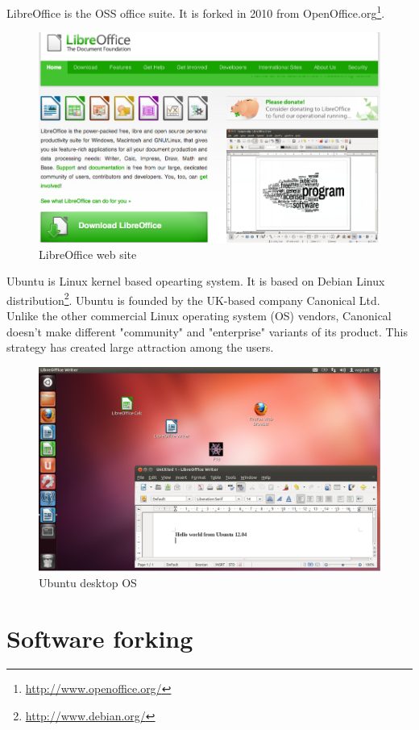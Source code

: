 \documentclass[times, utf8, seminar]{fit}
\begin{document}
LibreOffice is the OSS office suite. It is forked in 2010 from OpenOffice.org\footnote{\url{http://www.openoffice.org/}}.

\begin{figure}[H]
\centering
\includegraphics[width=12cm]{img/libre_web.png}
\caption{LibreOffice web site}
\end{figure}

Ubuntu is Linux kernel based opearting system. It is based on Debian Linux distribution\footnote{\url{http://www.debian.org/}}. Ubuntu is founded by the UK-based company Canonical Ltd. Unlike the other commercial Linux operating system (OS) vendors, Canonical doesn't make different "community" and "enterprise" variants of its product. This strategy has created large attraction among the users.   

\begin{figure}[H]
\centering
\includegraphics[width=12cm]{img/ubuntu_desktop.png}
\caption{Ubuntu desktop OS}
\end{figure}


\section{Software forking}
\end{document}
